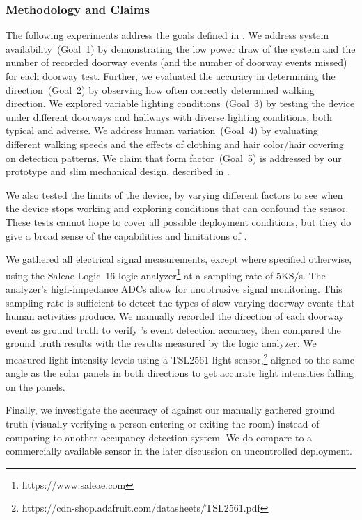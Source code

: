 \subsubsection{Methodology and Claims}
The following experiments address the goals defined in .
We address system availability~(Goal~1) by demonstrating the low power draw of the system and the number of recorded doorway events (and the number of doorway events missed) for each doorway test.
Further, we evaluated the accuracy in determining the direction~(Goal~2) by observing how often \sysname correctly determined walking direction.
We explored variable lighting conditions~(Goal~3) by testing the device under \numDoors different doorways and hallways with diverse lighting conditions, both typical and adverse.
We address human variation~(Goal~4) by evaluating different walking speeds and the effects of clothing and hair color/hair covering on detection patterns.
We claim that form factor~(Goal~5) is addressed by our prototype and slim mechanical design, described in .

We also tested the limits of the device, by varying different factors to see when the device stops working and exploring conditions that can confound the sensor.
These tests cannot hope to cover all possible deployment conditions, but they do give a broad sense of the capabilities and limitations of \sysname.

We gathered all electrical signal measurements, except where specified otherwise, using the Saleae Logic~16 logic analyzer\footnote{https://www.saleae.com} at a sampling rate of 5KS/s.
The analyzer's high-impedance ADCs allow for unobtrusive signal monitoring.
This sampling rate is sufficient to detect the types of slow-varying doorway events that human activities produce.
We manually recorded the direction of each doorway event as ground truth to verify \sysname's event detection accuracy, then compared the ground truth results with the results measured by the logic analyzer.
We measured light intensity levels using a TSL2561 light sensor,\footnote{https://cdn-shop.adafruit.com/datasheets/TSL2561.pdf}
aligned to the same angle as the solar panels in both directions to get accurate light intensities falling on the panels.

Finally, we investigate the accuracy of \sysname against our manually gathered ground truth (visually verifying a person entering or exiting the room) instead of comparing to another occupancy-detection system.  
We do compare \sysname to a commercially available sensor in the later discussion on uncontrolled deployment.

